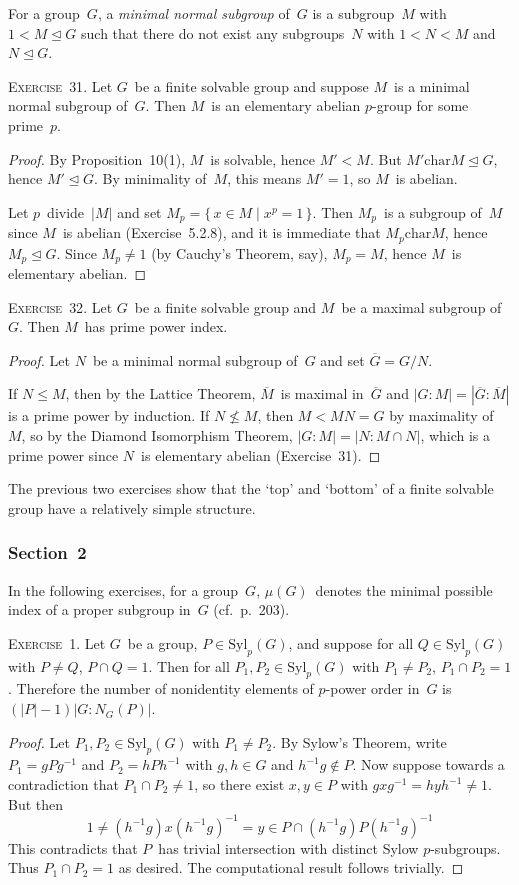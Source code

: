 \documentclass[letterpaper]{article}
\newcommand{\exercise}[1]{\goodbreak\noindent\textsc{Exercise~{#1}.}}
\newcommand{\sect}{\cap}
\newcommand{\subgroup}{\le}
\newcommand{\normal}{\trianglelefteq}
\newcommand{\chr}{\mathrel{\mathrm{char}}}
\newcommand{\syl}{\mathrm{Syl}}
\newcommand{\res}[1]{\overline{#1}}
\newcommand{\ord}[1]{|{#1}|}
\newcommand{\gindex}[2]{|{#1}:{#2}|}
\newcommand{\mpsi}[1]{\mu({#1})}
\begin{document}
\noindent For a group~$G$, a \emph{minimal normal subgroup} of~$G$ is a subgroup~$M$ with $1<M\normal G$ such that there do not exist any subgroups~$N$ with $1<N<M$ and $N\normal G$.

\bigskip
\exercise{31}
Let $G$~be a finite solvable group and suppose $M$~is a minimal normal subgroup of~$G$. Then $M$~is an elementary abelian $p$-group for some prime~$p$.
\begin{proof}
By Proposition~10(1), $M$~is solvable, hence $M'<M$. But $M'\chr M\normal G$, hence $M'\normal G$. By minimality of~$M$, this means $M'=1$, so $M$~is abelian.

Let $p$~divide~$\ord{M}$ and set $M_p=\{\,x\in M\mid x^p=1\,\}$. Then $M_p$~is a subgroup of~$M$ since $M$~is abelian (Exercise~5.2.8), and it is immediate that $M_p\chr M$, hence $M_p\normal G$. Since $M_p\ne1$ (by Cauchy's Theorem, say), $M_p=M$, hence $M$~is elementary abelian.
\end{proof}

\exercise{32} Let $G$~be a finite solvable group and $M$~be a maximal subgroup of~$G$. Then $M$~has prime power index.
\begin{proof}
Let $N$~be a minimal normal subgroup of~$G$ and set $\res{G}=G/N$.

If $N\subgroup M$, then by the Lattice Theorem, $\res{M}$~is maximal in~$\res{G}$ and $\gindex{G}{M}=\gindex{\res{G}}{\res{M}}$ is a prime power by induction. If $N\not\subgroup M$, then $M<MN=G$ by maximality of~$M$, so by the Diamond Isomorphism Theorem, $\gindex{G}{M}=\gindex{N}{M\sect N}$, which is a prime power since $N$~is elementary abelian (Exercise~31).
\end{proof}

\noindent The previous two exercises show that the `top' and `bottom' of a finite solvable group have a relatively simple structure.

\subsubsection*{Section~2}
\noindent In the following exercises, for a group~$G$, $\mpsi{G}$~denotes the minimal possible index of a proper subgroup in~$G$ (cf.~p.~203).

\bigskip
\exercise{1}
Let $G$~be a group, $P\in\syl_p(G)$, and suppose for all $Q\in\syl_p(G)$ with $P\ne Q$, $P\sect Q=1$. Then for all $P_1,P_2\in\syl_p(G)$ with $P_1\ne P_2$, $P_1\sect P_2=1$. Therefore the number of nonidentity elements of $p$-power order in~$G$ is $(\ord{P}-1)\gindex{G}{N_G(P)}$.
\begin{proof}
Let $P_1,P_2\in\syl_p(G)$ with $P_1\ne P_2$. By Sylow's Theorem, write $P_1=gPg^{-1}$ and $P_2=hPh^{-1}$ with $g,h\in G$ and $h^{-1}g\not\in P$. Now suppose towards a contradiction that $P_1\sect P_2\ne 1$, so there exist $x,y\in P$ with $gxg^{-1}=hyh^{-1}\ne 1$. But then
$$1\ne (h^{-1}g)x(h^{-1}g)^{-1}=y\in P\sect(h^{-1}g)P(h^{-1}g)^{-1}$$
This contradicts that $P$~has trivial intersection with distinct Sylow $p$-subgroups. Thus $P_1\sect P_2=1$ as desired. The computational result follows trivially.
\end{proof}
\end{document}
